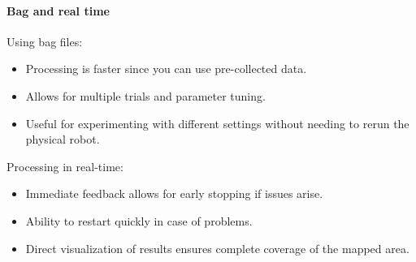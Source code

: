 \paragraph*{Bag and real time}
Using bag files:
\begin{itemize}
    \item Processing is faster since you can use pre-collected data.
    \item Allows for multiple trials and parameter tuning.
    \item Useful for experimenting with different settings without needing to rerun the physical robot.
\end{itemize}
Processing in real-time:
\begin{itemize}
    \item Immediate feedback allows for early stopping if issues arise.
    \item  Ability to restart quickly in case of problems.
    \item Direct visualization of results ensures complete coverage of the mapped area.
\end{itemize}